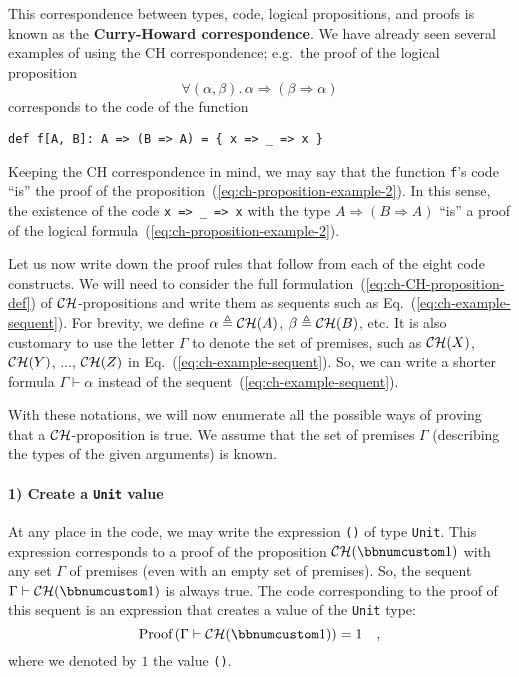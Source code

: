 This correspondence between types, code, logical propositions, and
proofs is known as the \textbf{Curry-Howard correspondence}.
We have already seen several examples of using the CH correspondence;
e.g.~the proof of the logical proposition 
\begin{equation}
\forall(\alpha,\beta).\,\alpha\Rightarrow\left(\beta\Rightarrow\alpha\right)\label{eq:ch-proposition-example-2}
\end{equation}
corresponds to the code of the function 
\begin{lstlisting}
def f[A, B]: A => (B => A) = { x => _ => x }
\end{lstlisting}
Keeping the CH correspondence in mind, we may say that the function
\lstinline!f!'s code ``is''
the proof of the proposition~(\ref{eq:ch-proposition-example-2}).
In this sense, the existence of the code \lstinline!x => _ => x!
with the type $A\Rightarrow(B\Rightarrow A)$ ``is'' a proof of
the logical formula~(\ref{eq:ch-proposition-example-2}).

Let us now write down the proof rules that follow from each of the
eight code constructs. We will need to consider the full formulation~(\ref{eq:ch-CH-proposition-def})
of ${\cal CH}$-propositions and write them as sequents such as Eq.~(\ref{eq:ch-example-sequent}).
For brevity, we define $\alpha\triangleq{\cal CH}(A)$, $\beta\triangleq{\cal CH}(B)$,
etc. It is also customary to use the letter $\Gamma$ to denote the
set of premises, such as ${\cal CH}(X)$, ${\cal CH}(Y)$, ..., ${\cal CH}(Z)$
in Eq.~(\ref{eq:ch-example-sequent}). So, we can write a shorter
formula $\Gamma\vdash\alpha$ instead of the sequent~(\ref{eq:ch-example-sequent}).

With these notations, we will now enumerate all the possible ways
of proving that a ${\cal CH}$-proposition is true. We assume that
the set of premises $\Gamma$ (describing the types of the given arguments)
is known.

\paragraph{1) Create a \lstinline!Unit!
value}

At any place in the code, we may write the expression \lstinline!()!
of type \lstinline!Unit!.
This expression corresponds to a proof of the proposition ${\cal CH}(\bbnum 1)$
with any set $\Gamma$ of premises (even with an empty set of premises).
So, the sequent $\Gamma\vdash{\cal CH}(\bbnum 1)$ is always true.
The code corresponding to the proof of this sequent is an expression
that creates a value of the \lstinline!Unit!
type:
\[
\text{Proof}\left(\Gamma\vdash{\cal CH}(\bbnum 1)\right)=1\quad,
\]
where we denoted by $1$ the value \lstinline!()!.

